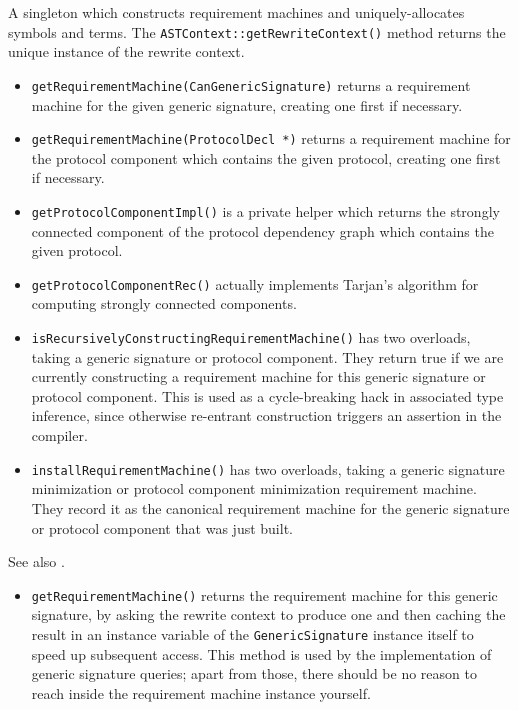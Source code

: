 \documentclass[../generics]{subfiles}
\begin{document}
A singleton which constructs requirement machines and uniquely-allocates symbols and terms. The \texttt{ASTContext::getRewriteContext()} method returns the unique instance of the rewrite context.
\begin{itemize}
\item \texttt{getRequirementMachine(CanGenericSignature)} returns a requirement machine for the given generic signature, creating one first if necessary.
\item \texttt{getRequirementMachine(ProtocolDecl *)} returns a requirement machine for the protocol component which contains the given protocol, creating one first if necessary.
\item \texttt{getProtocolComponentImpl()} is a private helper which returns the strongly connected component of the protocol dependency graph which contains the given protocol.
\item \texttt{getProtocolComponentRec()} actually implements Tarjan's algorithm for computing strongly connected components.
\item \texttt{isRecursivelyConstructingRequirementMachine()} has two overloads, taking a generic signature or protocol component. They return true if we are currently constructing a requirement machine for this generic signature or protocol component. This is used as a cycle-breaking hack in associated type inference, since otherwise re-entrant construction triggers an assertion in the compiler.
\item \texttt{installRequirementMachine()} has two overloads, taking a generic signature minimization or  protocol component minimization requirement machine. They record it as the canonical requirement machine for the generic signature or protocol component that was just built.
\end{itemize}

See also .
\begin{itemize}
\item \texttt{getRequirementMachine()} returns the requirement machine for this generic signature, by asking the rewrite context to produce one and then caching the result in an instance variable of the \texttt{GenericSignature} instance itself to speed up subsequent access. This method is used by the implementation of generic signature queries; apart from those, there should be no reason to reach inside the requirement machine instance yourself.
\end{itemize}
\end{document}

